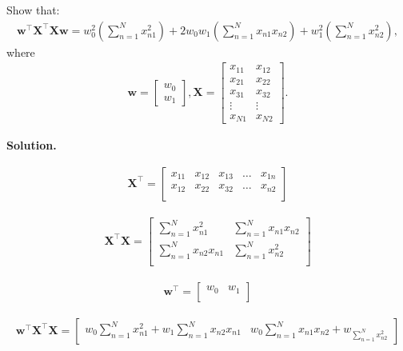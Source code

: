 \documentclass[10pt]{article}
\begin{document}
\begin{enumerate}
Show that:
\begin{eqnarray*}
\mathbf{w}^\top\mathbf{X}^\top\mathbf{X}\mathbf{w} = w_0^2 \left( \sum_{n=1}^N x_{n1}^2 \right) + 2w_0w_1 \left( \sum_{n=1}^N x_{n1}x_{n2} \right) + w_1^2 \left( \sum_{n=1}^N x_{n2}^2 \right),
\end{eqnarray*}
where
\begin{eqnarray*}
\mathbf{w} = 
    \begin{bmatrix}
    w_0 \\[0.3em]
    w_1
    \end{bmatrix}
    ,
\mathbf{X} = 
    \begin{bmatrix}
    x_{11} & x_{12} \\[0.3em]
    x_{21} & x_{22} \\[0.3em]
    x_{31} & x_{32} \\[0.3em]
    \vdots & \vdots \\[0.3em]
    x_{N1} & x_{N2}
    \end{bmatrix}
    .
\end{eqnarray*}

{\bf Solution.}

\begin{eqnarray*}
\mathbf{X}^\top = 
    \begin{bmatrix}
    x_{11} & x_{12} & x_{13} & \dots & x_{1n} \\[0.3em]
    x_{12} & x_{22} & x_{32} & \dots & x_{n2} \\[0.3em]
    \end{bmatrix}
\end{eqnarray*}


\begin{eqnarray*}
\mathbf{X}^\top\mathbf{X} = 
    \begin{bmatrix}
    {\sum_{n=1}^N x_{n1}^2}      & {\sum_{n=1}^N x_{n1} x_{n2}} \\[0.3em]
    {\sum_{n=1}^N x_{n2} x_{n1}} & {\sum_{n=1}^N x_{n2}^2}      \\[0.3em]
    \end{bmatrix}
\end{eqnarray*}

\begin{eqnarray*}
\mathbf{w}^\top = 
    \begin{bmatrix}
    w_0 & w_1 \\[0.3em]
    \end{bmatrix}
\end{eqnarray*}


\begin{eqnarray*}
\mathbf{w}^\top\mathbf{X}^\top\mathbf{X} = 
	\begin{bmatrix}
	w_0{\sum_{n=1}^N x_{n1}^2} + w_1{\sum_{n=1}^N x_{n2} x_{n1}} & 
	w_0{\sum_{n=1}^N x_{n1} x_{n2} + w_{\sum_{n=1}^N x_{n2}^2}}
	\end{bmatrix}
\end{eqnarray*}


\end{enumerate}
\end{document}
